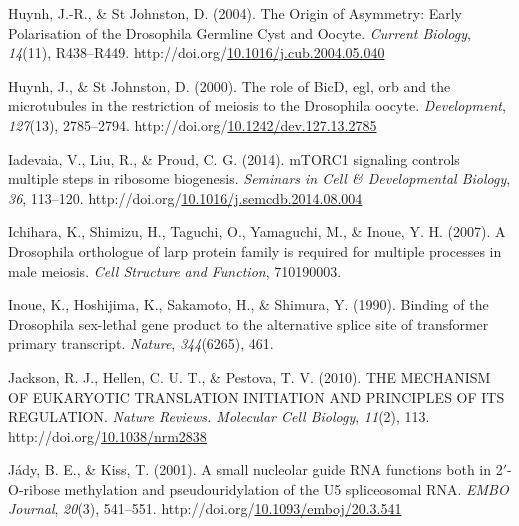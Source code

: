 \documentclass[12pt,oneside]{reedthesis}
\newlength{\cslhangindent}
\newenvironment{CSLReferences}[2] %
 {%
  \setlength{\parindent}{0pt}
  \ifodd #1 \everypar{\setlength{\hangindent}{\cslhangindent}}\ignorespaces\fi
  \ifnum #2 > 0
  \setlength{\parskip}{#2\baselineskip}
  \fi
 }%
 {}
\begin{document}
\begin{CSLReferences}{1}{0}
\leavevmode{}%
Huynh, J.-R., \& St Johnston, D. (2004). The {Origin} of {Asymmetry}: {Early Polarisation} of the {Drosophila Germline Cyst} and {Oocyte}. \emph{Current Biology}, \emph{14}(11), R438--R449. http://doi.org/\href{https://doi.org/10.1016/j.cub.2004.05.040}{10.1016/j.cub.2004.05.040}

\leavevmode{}%
Huynh, J., \& St Johnston, D. (2000). The role of {BicD}, egl, orb and the microtubules in the restriction of meiosis to the {Drosophila} oocyte. \emph{Development}, \emph{127}(13), 2785--2794. http://doi.org/\href{https://doi.org/10.1242/dev.127.13.2785}{10.1242/dev.127.13.2785}

\leavevmode{}%
Iadevaia, V., Liu, R., \& Proud, C. G. (2014). {mTORC1} signaling controls multiple steps in ribosome biogenesis. \emph{Seminars in Cell \& Developmental Biology}, \emph{36}, 113--120. http://doi.org/\href{https://doi.org/10.1016/j.semcdb.2014.08.004}{10.1016/j.semcdb.2014.08.004}

\leavevmode{}%
Ichihara, K., Shimizu, H., Taguchi, O., Yamaguchi, M., \& Inoue, Y. H. (2007). A {Drosophila} orthologue of larp protein family is required for multiple processes in male meiosis. \emph{Cell Structure and Function}, 710190003.

\leavevmode{}%
Inoue, K., Hoshijima, K., Sakamoto, H., \& Shimura, Y. (1990). Binding of the {Drosophila} sex-lethal gene product to the alternative splice site of transformer primary transcript. \emph{Nature}, \emph{344}(6265), 461.

\leavevmode{}%
Jackson, R. J., Hellen, C. U. T., \& Pestova, T. V. (2010). {THE MECHANISM OF EUKARYOTIC TRANSLATION INITIATION AND PRINCIPLES OF ITS REGULATION}. \emph{Nature Reviews. Molecular Cell Biology}, \emph{11}(2), 113. http://doi.org/\href{https://doi.org/10.1038/nrm2838}{10.1038/nrm2838}

\leavevmode{}%
Jády, B. E., \& Kiss, T. (2001). A small nucleolar guide {RNA} functions both in 2{\({'}\)}-{O-ribose} methylation and pseudouridylation of the {U5} spliceosomal {RNA}. \emph{EMBO Journal}, \emph{20}(3), 541--551. http://doi.org/\href{https://doi.org/10.1093/emboj/20.3.541}{10.1093/emboj/20.3.541}


\end{CSLReferences}
\end{document}
